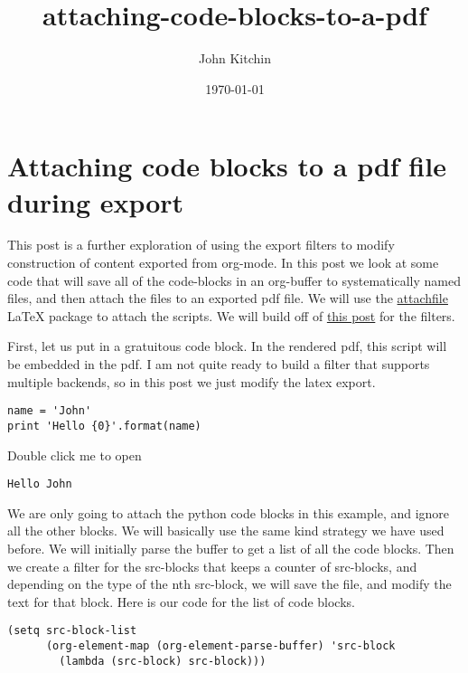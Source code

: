 \documentclass[11pt]{article}
\author{John Kitchin}
\date{\today}
\title{attaching-code-blocks-to-a-pdf}
\begin{document}
\maketitle
\tableofcontents


\section{Attaching code blocks to a pdf file during export}
\label{sec-1}
This post is a further exploration of using the export filters to modify construction of content exported from org-mode. In this post we look at some code that will save all of the code-blocks in an org-buffer to systematically named files, and then attach the files to an exported pdf file. We will use the \href{http://www.ctan.org/tex-archive/macros/latex/contrib/attachfile}{attachfile} \LaTeX{} package to attach the scripts. We will build off of \href{http://jkitchin.github.io/blog/2013/09/28/Customizing-export-of-code-blocks-in-HTML/}{this post} for the filters.

First, let us put in a gratuitous code block. In the rendered pdf, this script will be embedded in the pdf. I am not quite ready to build a filter that supports multiple backends, so in this post we just modify the latex export.

\begin{verbatim}
name = 'John'
print 'Hello {0}'.format(name)
\end{verbatim}


 Double click me to open\begin{verbatim}
Hello John
\end{verbatim}

We are only going to attach the python code blocks in this example, and ignore all the other blocks. We will basically use the same kind strategy we have used before. We will initially parse the buffer to get a list of all the code blocks. Then we create a filter for the src-blocks that keeps a counter of src-blocks, and depending on the type of the nth src-block, we will save the file, and modify the text for that block. Here is our code for the list of code blocks.

\begin{verbatim}
(setq src-block-list 
      (org-element-map (org-element-parse-buffer) 'src-block 
        (lambda (src-block) src-block)))
\end{verbatim}
\end{document}
